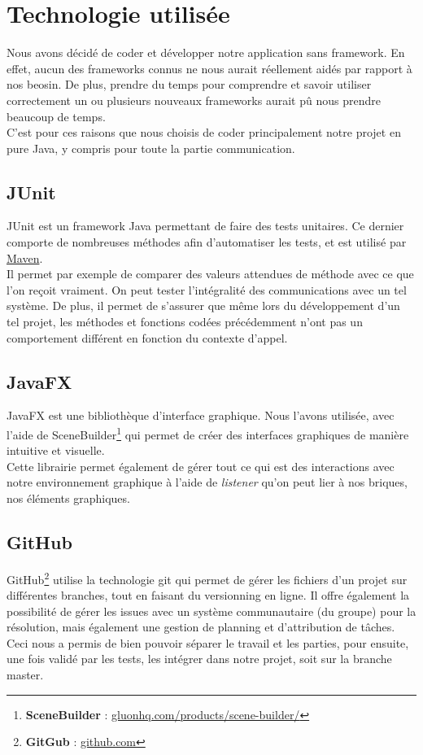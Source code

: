 \documentclass[a4paper,12pt]{article}
\begin{document}
	\section{Technologie utilisée}
	Nous avons décidé de coder et développer notre application sans framework. En effet, aucun des frameworks connus ne nous aurait réellement aidés par rapport à nos beosin. De plus, prendre du temps pour comprendre et savoir utiliser correctement un ou plusieurs nouveaux frameworks aurait pû nous prendre beaucoup de temps. \\
	C'est pour ces raisons que nous choisis de coder principalement notre projet en pure Java, y compris pour toute la partie communication. 
	
		\subsection{JUnit}
		JUnit est un framework Java permettant de faire des tests unitaires. Ce dernier comporte de nombreuses méthodes afin d'automatiser les tests, et est utilisé par \hyperref[maven]{Maven}.\\
		Il permet par exemple de comparer des valeurs attendues de méthode avec ce que l'on reçoit vraiment. On peut tester l'intégralité des communications avec un tel système. De plus, il permet de s'assurer que même lors du développement d'un tel projet, les méthodes et fonctions codées précédemment n'ont pas un comportement différent en fonction du contexte d'appel. 
		
		\subsection{JavaFX}
		JavaFX est une bibliothèque d'interface graphique. Nous l'avons utilisée, avec l'aide de SceneBuilder\footnote{\textbf{SceneBuilder} : \href{http://gluonhq.com/products/scene-builder/}{gluonhq.com/products/scene-builder/}} qui permet de créer des interfaces graphiques de manière intuitive et visuelle. \\
		Cette librairie permet également de gérer tout ce qui est des interactions avec notre environnement graphique à l'aide de \textit{listener} qu'on peut lier à nos briques, nos éléments graphiques. 
		
		\subsection{GitHub}
		GitHub\footnote{\textbf{GitGub} : \href{http:/github.com}{github.com}} utilise la technologie git qui permet de gérer les fichiers d'un projet sur différentes branches, tout en faisant du versionning en ligne. Il offre également la possibilité de gérer les issues avec un système communautaire (du groupe) pour la résolution, mais également une gestion de planning et d'attribution de tâches. \\
		Ceci nous a permis de bien pouvoir séparer le travail et les parties, pour ensuite, une fois validé par les tests, les intégrer dans notre projet, soit sur la branche master. 
		
\end{document}
